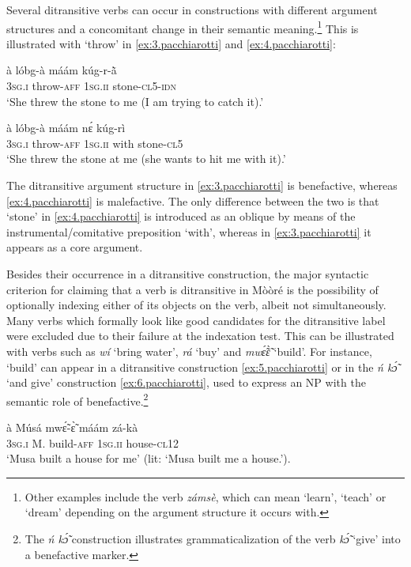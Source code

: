 \documentclass[output=paper]{langsci/langscibook}
\begin{document}
Several ditransitive verbs can occur in constructions with different argument structures and a concomitant change in their semantic meaning.\footnote{Other examples include the verb \textit{z\'{a}ms\`{e}}, which can mean `learn', `teach' or `dream' depending on the argument structure it occurs with.} This is illustrated with `throw' in \ref{ex:3.pacchiarotti} and \ref{ex:4.pacchiarotti}:  

\ea
\label{ex:3.pacchiarotti}
\gll \`{a}    l\'{o}bg-\`{a}    m\'{a}\'{a}m    k\'{u}g-r-\`{\~{a}}\\
\textsc{3sg.i}  throw-\textsc{aff}  \textsc{1sg.ii}  stone-\textsc{cl5-idn} \\
\glt `She threw the stone to me (I am trying to catch it).'  
\z

\ea
\label{ex:4.pacchiarotti}
\gll \`{a}    l\'{o}bg-\`{a}    m\'{a}\'{a}m    nɛ́  k\'{u}g-r\`{i} \\
\textsc{3sg.i  }  throw-\textsc{aff}  \textsc{1sg.ii  }  with  stone-\textsc{cl5} \\
\glt `She threw the stone at me (she wants to hit me with it).'
\z

The ditransitive argument structure in \ref{ex:3.pacchiarotti} is benefactive, whereas \ref{ex:4.pacchiarotti} is malefactive. The only difference between the two is that `stone' in \ref{ex:4.pacchiarotti} is introduced as an oblique by means of the instrumental/comitative preposition `with', whereas in \ref{ex:3.pacchiarotti} it appears as a core argument. 

Besides their occurrence in a ditransitive construction, the major syntactic criterion for claiming that a verb is ditransitive in Mòòré is the possibility of optionally indexing either of its objects on the verb, albeit not simultaneously. Many verbs which formally look like good candidates for the ditransitive label were excluded due to their failure at the indexation test. This can be illustrated with verbs such as \textit{w\'{i}} `bring water', \textit{r\'{a}} `buy' and \textit{mw\'{\~{ɛ}}\`{\~{ɛ}}} `build'. For instance, `build' can appear in a ditransitive construction \ref{ex:5.pacchiarotti} or in the \textit{\'{n} k\'{\~{ɔ}}} `and give' construction \ref{ex:6.pacchiarotti}, used to express an NP with the semantic role of benefactive.\footnote{The\textit{ \'{n} k\'{\~{ɔ}}} construction illustrates grammaticalization of the verb \textit{k\'{\~{ɔ}}} `give' into a benefactive marker.} 

\ea
\label{ex:5.pacchiarotti}
\gll \`{a}    M\'{u}s\'{a}  mwɛ̃́-ɛ̃̀    m\'{a}\'{a}m    z\'{a}-k\`{a} \\
\textsc{3sg.i  }  M.  build-\textsc{aff}  \textsc{1sg.ii  }  house-\textsc{cl12} \\
\glt `Musa built a house for me' (lit: `Musa built me a house.'). 
\z
\end{document}
